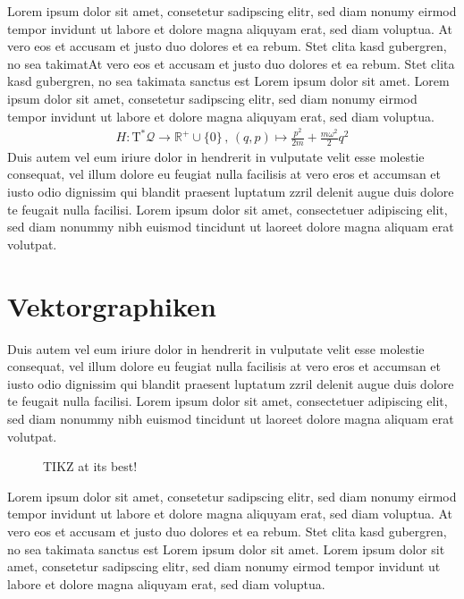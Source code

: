 \documentclass[12pt, a4paper, twoside, headsepline]{scrartcl}
\begin{document}
Lorem ipsum\cite{zfsbsd} dolor sit amet, consetetur sadipscing elitr, sed diam nonumy eirmod tempor invidunt ut labore et dolore magna aliquyam\cite{zfsrel} erat, sed diam voluptua. At vero eos et accusam et justo duo dolores et ea rebum. Stet clita kasd gubergren, no sea takimatAt vero eos et accusam et justo duo dolores et ea rebum. Stet clita kasd gubergren, no sea takimata sanctus est Lorem ipsum dolor sit amet. Lorem ipsum dolor sit amet, consetetur sadipscing elitr, sed diam nonumy eirmod tempor invidunt ut labore et dolore magna aliquyam erat, sed diam voluptua. 
\begin{align}
H: \mathrm T^\ast \mathcal Q \rightarrow  \mathbb R^+ \cup \{0\} \, , \, (q,p) \mapsto \frac{p^2}{2m} + \frac{m \omega^2}{2} q^2
\end{align}
Duis autem vel eum iriure dolor in hendrerit in vulputate velit esse molestie consequat, vel illum dolore eu feugiat nulla facilisis at vero eros et accumsan et iusto odio dignissim qui blandit praesent luptatum zzril delenit augue duis dolore te feugait nulla facilisi. Lorem ipsum dolor sit amet, consectetuer adipiscing elit, sed diam nonummy nibh euismod tincidunt ut laoreet dolore magna aliquam erat volutpat. 

\section{Vektorgraphiken}

Duis autem vel eum iriure dolor in hendrerit in vulputate velit esse molestie consequat, vel illum dolore eu feugiat nulla facilisis at vero eros et accumsan et iusto odio dignissim qui blandit praesent luptatum zzril delenit augue duis dolore te feugait nulla facilisi. Lorem ipsum dolor sit amet, consectetuer adipiscing elit, sed diam nonummy nibh euismod tincidunt ut laoreet dolore magna aliquam erat volutpat. 
\begin{figure}[h!]
 \centering
 \caption{TIKZ at its best!}
\end{figure}
Lorem ipsum dolor sit amet, consetetur sadipscing elitr, sed diam nonumy eirmod tempor invidunt ut labore et dolore magna aliquyam erat, sed diam voluptua. At vero eos et accusam et justo duo dolores et ea rebum. Stet clita kasd gubergren, no sea takimata sanctus est Lorem ipsum dolor sit amet. Lorem ipsum dolor sit amet, consetetur sadipscing elitr, sed diam nonumy eirmod tempor invidunt ut labore et dolore magna aliquyam erat, sed diam voluptua. 
\end{document}
